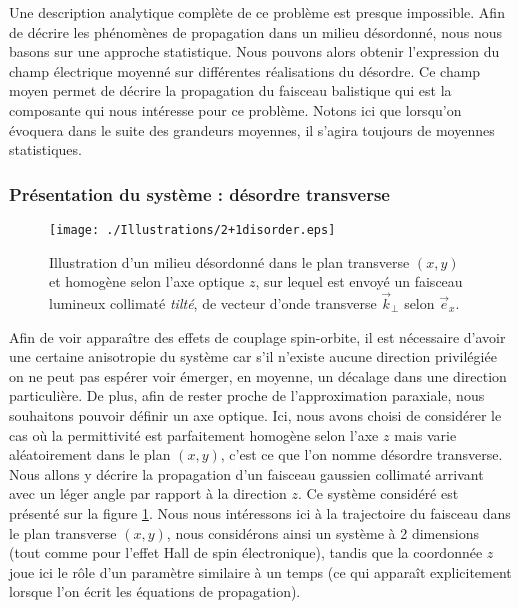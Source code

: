 \documentclass[a4paper,11pt]{article} %
\begin{document}
	Une description analytique complète de ce problème est presque impossible. Afin de décrire les phénomènes de propagation dans un milieu désordonné, nous nous basons sur une approche statistique. Nous pouvons alors obtenir l'expression du champ électrique moyenné sur différentes réalisations du désordre. Ce champ moyen permet de décrire la propagation du faisceau balistique qui est la composante qui nous intéresse pour ce problème. Notons ici que lorsqu'on évoquera dans le suite des grandeurs moyennes, il s'agira toujours de moyennes statistiques.
	
	
	\subsubsection{Présentation du système : désordre transverse}
	
	\begin{figure}[h]
		\centering
		\begin{minipage}[c]{0.85\linewidth}
			\centering
			\texttt{[image: ./Illustrations/2+1disorder.eps]}
			\caption{Illustration d'un milieu désordonné dans le plan transverse $ (x,y) $ et homogène selon l'axe optique $ z $, sur lequel est envoyé un faisceau lumineux collimaté \textit{tilté}, de vecteur d'onde transverse $ \vec{k}_\perp $ selon $ \vec{e}_x $.}
			\label{fig:systeme_desordre_transverse}
		\end{minipage}
	\end{figure}

	Afin de voir apparaître des effets de couplage spin-orbite, il est nécessaire d'avoir une certaine anisotropie du système car s'il n'existe aucune direction privilégiée on ne peut pas espérer voir émerger, en moyenne, un décalage dans une direction particulière. De plus, afin de rester proche de l'approximation paraxiale, nous souhaitons pouvoir définir un axe optique. Ici, nous avons choisi de considérer le cas où la permittivité est parfaitement homogène selon l'axe $ z $ mais varie aléatoirement dans le plan $ (x,y) $, c'est ce que l'on nomme désordre transverse. Nous allons y décrire la propagation d'un faisceau gaussien collimaté arrivant avec un léger angle par rapport à la direction $ z $. Ce système considéré est présenté sur la figure \ref{fig:systeme_desordre_transverse}. %
	Nous nous intéressons ici à la trajectoire du faisceau dans le plan transverse $ (x,y) $, nous considérons ainsi un système à 2 dimensions (tout comme pour l'effet Hall de spin électronique), tandis que la coordonnée $ z $ joue ici le rôle d'un paramètre similaire à un temps (ce qui apparaît explicitement lorsque l'on écrit les équations de propagation).\\
	
\end{document}

